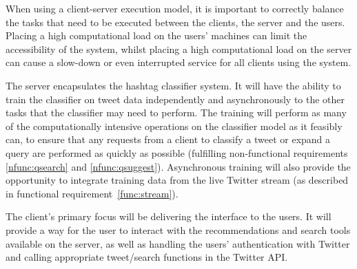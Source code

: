 \documentclass[11pt,a4paper]{report}
\begin{document}
When using a client-server execution model, it is important to correctly balance the tasks that need to be executed between the clients, the server and the users. Placing a high computational load on the users' machines can limit the accessibility of the system, whilst placing a high computational load on the server can cause a slow-down or even interrupted service for all clients using the system.

The server encapsulates the hashtag classifier system. It will have the ability to train the classifier on tweet data independently and asynchronously to the other tasks that the classifier may need to perform. The training will perform as many of the computationally intensive operations on the classifier model as it feasibly can, to ensure that any requests from a client to classify a tweet or expand a query are performed as quickly as possible (fulfilling non-functional requirements \ref{nfunc:qsearch} and \ref{nfunc:qsuggest}). Asynchronous training will also provide the opportunity to integrate training data from the live Twitter stream (as described in functional requirement~\ref{func:stream}).

The client's primary focus will be delivering the interface to the users. It will provide a way for the user to interact with the recommendations and search tools available on the server, as well as handling the users' authentication with Twitter and calling appropriate tweet/search functions in the Twitter API.
\end{document}
